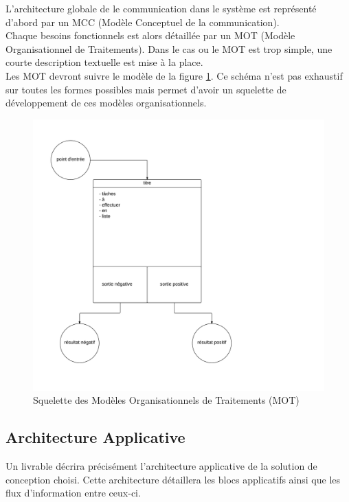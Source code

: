 L'architecture globale de le communication dans le système est représenté
d'abord par un MCC (Modèle Conceptuel de la communication). \\

Chaque besoins fonctionnels est alors détaillée par un MOT (Modèle
Organisationnel de Traitements). Dans le cas ou le MOT est trop simple, une
courte description textuelle est mise à la place. \\

Les MOT devront suivre le modèle de la figure \ref{fig:mot-skeleton}. Ce schéma
n'est pas exhaustif sur toutes les formes possibles mais permet d'avoir un
squelette de développement de ces modèles organisationnels. \\

\begin{figure}[ht]
    \centering
    \includegraphics[width=\textwidth]{mot-skeleton}
    \caption{Squelette des Modèles Organisationnels de Traitements (MOT)}
    \label{fig:mot-skeleton}
\end{figure}

\subsection{Architecture Applicative}
Un livrable décrira précisément l'architecture applicative de la solution de
conception choisi. Cette architecture détaillera les blocs applicatifs ainsi
que les flux d'information entre ceux-ci. \\

